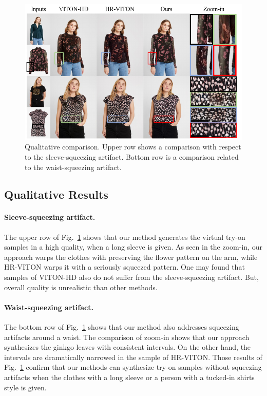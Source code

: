 \documentclass[letterpaper]{article} %
\begin{document}
\begin{figure}[t]
    \centering
    \includegraphics[width=\linewidth]{fig/fig5.pdf}
    \caption{Qualitative comparison. Upper row shows a comparison with respect to the sleeve-squeezing artifact. Bottom row is a comparison related to the waist-squeezing artifact.
    }
    \label{qualitative_twocol_res}
\end{figure}

\subsection{Qualitative Results}

\paragraph{Sleeve-squeezing artifact.} The upper row of Fig.~\ref{qualitative_twocol_res} shows that our method generates the virtual try-on samples in a high quality, when a long sleeve is given.
As seen in the zoom-in, our approach warps the clothes with preserving the flower pattern on the arm, while HR-VITON warps it with a seriously squeezed pattern.
One may found that samples of VITON-HD also do not suffer from the sleeve-squeezing artifact. 
But, overall quality is unrealistic than other methods.

\paragraph{Waist-squeezing artifact.} The bottom row of Fig.~\ref{qualitative_twocol_res} shows that our method also addresses squeezing artifacts around a waist.
The comparison of zoom-in shows that our approach synthesizes the ginkgo leaves with consistent intervals.
On the other hand, the intervals are dramatically narrowed in the sample of HR-VITON.
Those results of Fig.~\ref{qualitative_twocol_res} confirm that our methods can synthesize try-on samples without squeezing artifacts when the clothes with a long sleeve or a person with a tucked-in shirts style is given.
\end{document}
